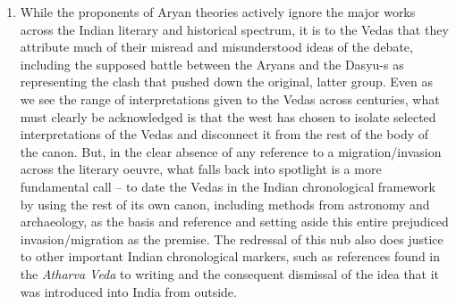 \begin{enumerate}
 \item While the proponents of Aryan theories actively ignore the major works across the Indian literary and historical spectrum, it is to the Vedas that they attribute much of their misread and misunderstood ideas of the debate, including the supposed battle between the Aryans and the Dasyu-s as representing the clash that pushed down the original, latter group. Even as we see the range of interpretations given to the Vedas across centuries, what must clearly be acknowledged is that the west has chosen to isolate selected interpretations of the Vedas and disconnect it from the rest of the body of the canon. But, in the clear absence of any reference to a migration/invasion across the literary oeuvre, what falls back into spotlight is a more fundamental call – to date the Vedas in the Indian chronological framework by using the rest of its own canon, including methods from astronomy and archaeology, as the basis and reference and setting aside this entire prejudiced invasion/migration as the premise. The redressal of this nub also does justice to other important Indian chronological markers, such as references found in the \textit{Atharva Veda} to writing and the consequent dismissal of the idea that it was introduced into India from outside.


\end{enumerate}
